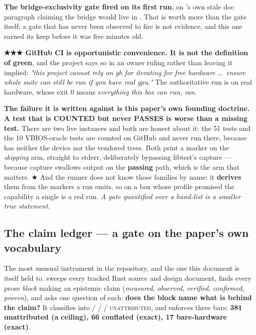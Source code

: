 \documentclass[10.5pt]{article}
\begin{document}
\textbf{The bridge-exclusivity gate fired on its first run}, on 's own stale
doc paragraph claiming the bridge would live in . That is worth more than the
gate itself: a gate that has never been observed to fire is not evidence, and this one earned its
keep before it was five minutes old.

\begin{claimbox}\small
\textbf{★★★ GitHub CI is opportunistic convenience. It is not the definition of green}, and the
project says so in an owner ruling rather than leaving it implied: \emph{"this project cannot
rely on gh for iterating for free hardware \dots\ ensure whole suite can still be run if you have
real gpu."} The authoritative run is  on real hardware, whose
exit 0 means \emph{everything this box can run, ran}.

\smallskip
\textbf{The failure it is written against is this paper's own founding doctrine.} \textbf{A test
that is COUNTED but never PASSES is worse than a missing test.} There are two live instances and
both are honest about it: the 51  tests and the 10 VBIOS-oracle tests are counted
on GitHub and never run there, because  has neither the device nor the
vendored trees. Both print a marker on the \emph{skipping} arm, straight to stderr, deliberately
bypassing libtest's capture — because capture swallows output on the \textbf{passing} path, which
is the arm that matters. ★ And the runner does not know those families by name: it
\textbf{derives} them from the markers a run emits, so on a box whose profile promised the
capability a single  is a red run. \emph{A gate quantified over a hand-list is a
smaller true statement.}
\end{claimbox}

\subsection{The claim ledger --- a gate on the paper's own vocabulary}
\label{sec:ledger}

The most unusual instrument in the repository, and the one this document is itself held to.
 sweeps every tracked Rust source and design document, finds every
prose \emph{block} making an epistemic claim (\emph{measured}, \emph{observed}, \emph{verified},
\emph{confirmed}, \emph{proven}), and asks one question of each: \textbf{does the block name what
is behind the claim?} It classifies into \measured{} / \inferred{} / \assumed{} /
\textsc{unattributed}, and enforces three bars: \textbf{381 unattributed (a ceiling), 66 conflated
(exact), 17 bare-hardware (exact)}.
\end{document}
